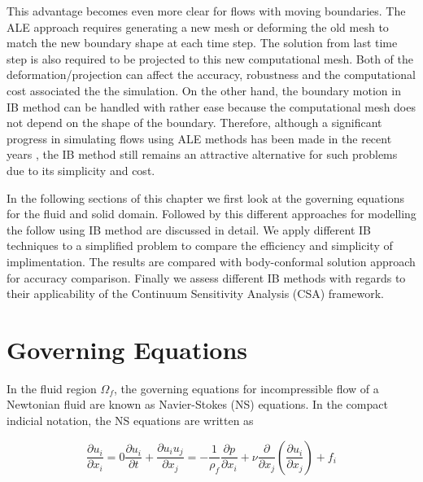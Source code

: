 This advantage becomes even more clear for flows with moving boundaries. The ALE approach requires generating a new mesh or deforming the old mesh to match the new boundary shape at each time step. The solution from last time step is also required to be projected to this new computational mesh. Both of the deformation/projection can affect the accuracy, robustness and the computational cost associated the the simulation. On the other hand, the boundary motion in IB method can be handled with rather ease because the computational mesh does not depend on the shape of the boundary. Therefore, although a significant progress in simulating flows using ALE methods has been made in the recent years \cite{lomtev1999discontinuous, farhat2004cfd, cheng2005fluid}, the IB method still remains an attractive alternative for such problems due to its simplicity and cost.

In the following sections of this chapter we first look at the governing equations for the fluid and solid domain. Followed by this different approaches for modelling the follow using IB method are discussed in detail. We apply different IB techniques to a simplified problem to compare the efficiency and simplicity of implimentation. The results are compared with body-conformal solution approach for accuracy comparison. Finally we assess different IB methods with regards to their applicability of the Continuum Sensitivity Analysis (CSA) framework.

\section{Governing Equations}
In the fluid region $\Omega_f$, the governing equations for incompressible flow of a Newtonian fluid are known as Navier-Stokes (NS) equations. In the compact indicial notation, the NS equations are written as

\begin{subequations}\label{eq:C3_GE}
\begin{equation}\label{eq:C3_continuity}
	\frac{\partial u_i}{\partial x_i} = 0
\end{equation}
\begin{equation}\label{eq:C3_momentum}
	\frac{\partial u_i}{\partial t} + \frac{\partial u_i u_j}{\partial x_j} = 
	-\frac{1}{\rho_f	} \frac{\partial p}{\partial x_i} + 
	\nu \frac{\partial}{\partial x_j} \left( \frac{\partial u_i}{\partial x_j} \right) + 
	f_i
\end{equation}
\end{subequations}

